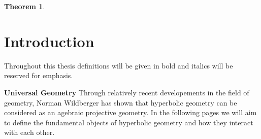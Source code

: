 \documentclass{unswthesis}
\newtheorem{theorem}{Theorem}
\begin{document}
\begin{theorem}
\bigskip
\end{theorem}

\bigskip \pagebreak

\chapter{\protect\bigskip Introduction}

Throughout this thesis definitions will be given in bold and italics will be
reserved for emphasis.\newline

\textbf{Universal Geometry} Through relatively recent developements in the
field of geometry, Norman Wildberger has shown that hyperbolic geometry can
be considered as an agebraic projective geometry. In the following pages we
will aim to define the fundamental objects of hyperbolic geometry and how
they interact with each other.\newline
\end{document}
